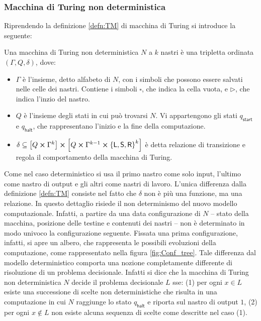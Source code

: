 \subsubsection{Macchina di Turing non deterministica}
Riprendendo la definizione \ref{defn:TM} di macchina di Turing si introduce la seguente:
\begin{defn}\label{defn:NDTM}
 Una macchina di Turing non deterministica $N$ a $k$ nastri è una tripletta ordinata $\left(\Gamma, Q, \delta \right)$, dove:
 \begin{itemize}
  \item $\Gamma$ è l'insieme, detto {\upshape alfabeto} di $N$, con i simboli che possono essere salvati nelle celle dei nastri.
  Contiene i simboli $\square$, che indica la cella vuota, e $\rhd$, che indica l'inzio del nastro.
  \item $Q$ è l'insieme degli {\upshape stati} in cui può trovarsi $N$.
  Vi appartengono gli stati $q_{\mathsf{start}}$ e $q_{\mathsf{halt}}$, che rappresentano l'inizio e la fine della computazione.
  \item $\delta \subseteq \left[Q \cross \Gamma^k\right] \cross \left[Q \cross \Gamma^{k-1} \cross \left\{\mathsf{L}, \mathsf{S}, \mathsf{R}\right\}^k \right]$ è detta {\upshape relazione di transizione} e regola il comportamento della macchina di Turing.
 \end{itemize}
\end{defn}
Come nel caso deterministico si usa il primo nastro come solo input, l'ultimo come nastro di output e gli altri come nastri di lavoro.
L'unica differenza dalla definizione \ref{defn:TM} consiste nel fatto che $\delta$ non è più una funzione, ma una relazione.
In questo dettaglio risiede il non determinismo del nuovo modello computazionale. Infatti, a partire da una data configurazione di $N$ -- stato della macchina, posizione delle testine e contenuti dei nastri -- non è determinato in modo univoco la configurazione seguente.
Fissata una prima configurazione, infatti, si apre un albero, che rappresenta le possibili evoluzioni della computazione, come rappresentato nella figura \ref{fig:Conf_tree}.
Tale differenza dal modello deterministico comporta una nozione completamente differente di risoluzione di un problema decisionale.
Infatti si dice che la macchina di Turing non deterministica $N$ decide il problema decisionale $L$ sse: (1) per ogni $x \in L$ esiste una successione di scelte non deterministiche che risulta in una computazione in cui $N$ raggiunge lo stato $q_{\mathsf{halt}}$ e riporta sul nastro di output $1$, (2) per ogni $x \notin L$ non esiste alcuna sequenza di scelte come descritte nel caso (1).


